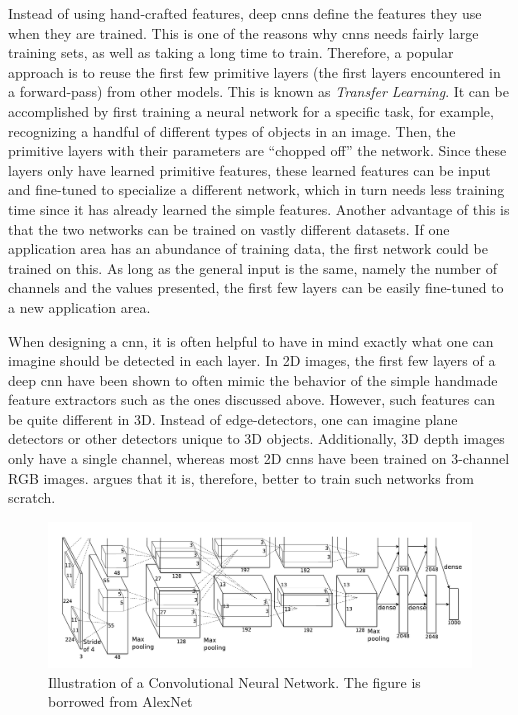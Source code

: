 Instead of using hand-crafted features, deep \gls{cnn}s define the features they use when they are trained. This is one of the reasons why \gls{cnn}s needs fairly large training sets, as well as taking a long time to train. Therefore, a popular approach is to reuse the first few primitive layers (the first layers encountered in a forward-pass) from other models. This is known as \emph{Transfer Learning}. It can be accomplished by first training a neural network for a specific task, for example, recognizing a handful of different types of objects in an image. Then, the primitive layers with their parameters are ``chopped off'' the network. Since these layers only have learned primitive features, these learned features can be input and fine-tuned to specialize a different network, which in turn needs less training time since it has already learned the simple features. Another advantage of this is that the two networks can be trained on vastly different datasets. If one application area has an abundance of training data, the first network could be trained on this. As long as the general input is the same, namely the number of channels and the values presented, the first few layers can be easily fine-tuned to a new application area.

When designing a \gls{cnn}, it is often helpful to have in mind exactly what one can imagine should be detected in each layer. In 2D images, the first few layers of a deep \gls{cnn} have been shown to often mimic the behavior of the simple handmade feature extractors such as the ones discussed above. However, such features can be quite different in 3D. Instead of edge-detectors, one can imagine plane detectors or other detectors unique to 3D objects. Additionally, 3D depth images only have a single channel, whereas most 2D \gls{cnn}s have been trained on 3-channel RGB images. \cite{song2018depth} argues that it is, therefore, better to train such networks from scratch.

\begin{figure}[h]
  \centering
  \includegraphics[width=\textwidth]{img/alexnet}
  \caption[AlexNet]{Illustration of a Convolutional Neural Network. The figure is borrowed from AlexNet~\cite{alexnet2012}}
  \label{fig:alexnet}
\end{figure}

